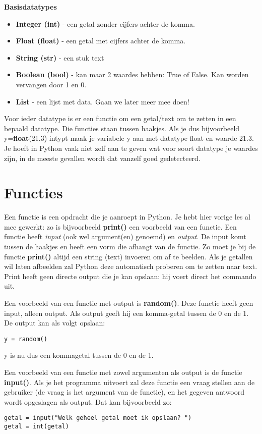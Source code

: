 \textbf{Basisdatatypes}
\begin{itemize}
\item \textbf{Integer (int)} - een getal zonder cijfers achter de komma.
\item \textbf{Float (float)} - een getal met cijfers achter de komma.
\item \textbf{String (str)} - een stuk text
\item \textbf{Boolean (bool)} - kan maar 2 waardes hebben: True of False. Kan worden vervangen door 1 en 0. 
\item \textbf{List} - een lijst met data. Gaan we later meer mee doen!
\end{itemize}

Voor ieder datatype is er een functie om een getal/text om te zetten in een bepaald datatype. Die functies staan tussen haakjes. Als je dus bijvoorbeeld y=\textbf{float}(21.3) intypt maak je variabele y aan met datatype float en waarde 21.3. Je hoeft in Python vaak niet zelf aan te geven wat voor soort datatype je waardes zijn, in de meeste gevallen wordt dat vanzelf goed gedetecteerd.

\section{Functies}

Een functie is een opdracht die je aanroept in Python. Je hebt hier vorige les al mee gewerkt: zo is bijvoorbeeld \textbf{print()} een voorbeeld van een functie. Een functie heeft  \textit{input} (ook wel argument(en) genoemd) en \textit{output}. De input komt tussen de haakjes en heeft een vorm die afhangt van de functie. Zo moet je bij de functie \textbf{print()}  altijd een string (text) invoeren om af te beelden. Als je getallen wil laten afbeelden zal Python deze automatisch proberen om te zetten naar text. Print heeft geen directe output die je kan opslaan: hij voert direct het commando uit.

Een voorbeeld van een functie met output is \textbf{random()}. Deze functie heeft geen input, alleen output. Als output geeft hij een komma-getal tussen de 0 en de 1. De output kan als volgt opslaan:
\begin{lstlisting}[frame=single]
y = random() 
\end{lstlisting}
y is nu dus een kommagetal tussen de 0 en de 1. 

Een voorbeeld van een functie met zowel argumenten als output is de functie \textbf{input()}. Als je het programma uitvoert zal deze functie een vraag stellen aan de gebruiker (de vraag is het argument van de functie), en het gegeven antwoord wordt opgeslagen als output. Dat kan bijvoorbeeld zo:
\begin{lstlisting}[frame=single]
getal = input("Welk geheel getal moet ik opslaan? ")
getal = int(getal)
\end{lstlisting}

